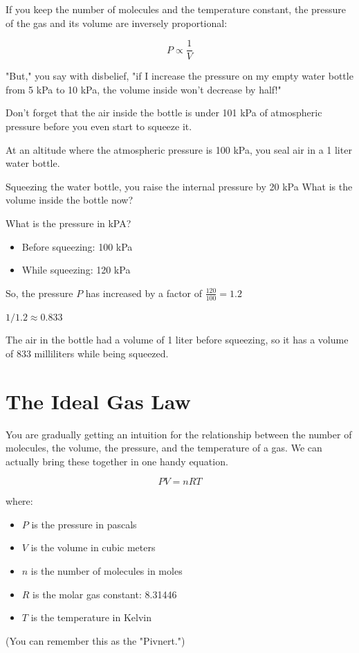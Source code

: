 If you keep the number of molecules and the temperature constant,  the pressure of the gas and its volume are inversely proportional:

$$P \propto \frac{1}{V}$$

"But," you say with disbelief, "if I increase the pressure on my empty water bottle from 5 kPa to 10 kPa,  the volume inside won't decrease by half!"

Don't forget that the air inside the bottle is under 101 kPa of atmospheric pressure before you even start to squeeze it.

\begin{Exercise}[title={Temperature and Volume},  label=temp_vol]
  
At an altitude where the atmospheric pressure is 100 kPa,  you seal air in a 1 liter water bottle.

Squeezing the water bottle,  you raise the internal pressure by 20 kPa  What is the volume inside the bottle now?

\end{Exercise}
\begin{Answer}[ref=temp_vol]

What is the pressure in kPA?  
\begin{itemize}
\item Before squeezing: 100 kPa
\item While squeezing: 120 kPa
\end{itemize}

So, the pressure $P$ has increased by a factor of $\frac{120}{100} = 1.2$

$1/1.2 \approx 0.833$

The air in the bottle had a volume of 1 liter before squeezing, so it has a volume of 833 milliliters while being squeezed.

\end{Answer}

\section{The Ideal Gas Law}

You are gradually getting an intuition for the relationship between the number of molecules, the volume, the pressure, and the temperature of a gas.
We can actually bring these together in one handy equation.

\begin{mdframed}[style=important, frametitle={Ideal Gas Law}]

$$PV = nRT$$

where:
\begin{itemize}
\item $P$ is the pressure in pascals
\item $V$ is the volume in cubic meters
\item $n$ is the number of molecules in moles
\item $R$ is the molar gas constant: 8.31446
\item $T$ is the temperature in Kelvin
\end{itemize}

(You can remember this as the "Pivnert.")

\end{mdframed}

